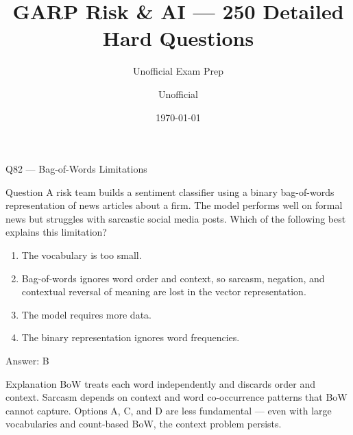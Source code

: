 \documentclass[aspectratio=169,8pt]{beamer}
\title[GARP RAI]{GARP Risk \& AI --- 250 Detailed Hard Questions}
\subtitle{Unofficial Exam Prep}
\author{Unofficial}
\date{\today}
\begin{document}
	



\begin{frame}{Q82 --- Bag-of-Words Limitations}
\begin{block}{Question}
A risk team builds a sentiment classifier using a binary bag-of-words representation of news articles about a firm. The model performs well on formal news but struggles with sarcastic social media posts. Which of the following best explains this limitation?
\end{block}
\begin{enumerate}
\item The vocabulary is too small.
\item Bag-of-words ignores word order and context, so sarcasm, negation, and contextual reversal of meaning are lost in the vector representation.
\item The model requires more data.
\item The binary representation ignores word frequencies.
\end{enumerate}
\begin{exampleblock}{Answer: B}\end{exampleblock}
\begin{block}{Explanation}
BoW treats each word independently and discards order and context. Sarcasm depends on context and word co-occurrence patterns that BoW cannot capture. Options A, C, and D are less fundamental --- even with large vocabularies and count-based BoW, the context problem persists.
\end{block}
\end{frame}
\end{document}
